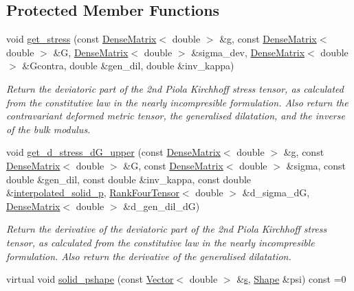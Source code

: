 \subsection*{Protected Member Functions}
\begin{DoxyCompactItemize}
\item 
void \hyperlink{classoomph_1_1PVDEquationsWithPressure_a4ae331361c8fd63725a55050e90e9e2d}{get\+\_\+stress} (const \hyperlink{classoomph_1_1DenseMatrix}{Dense\+Matrix}$<$ double $>$ \&g, const \hyperlink{classoomph_1_1DenseMatrix}{Dense\+Matrix}$<$ double $>$ \&G, \hyperlink{classoomph_1_1DenseMatrix}{Dense\+Matrix}$<$ double $>$ \&sigma\+\_\+dev, \hyperlink{classoomph_1_1DenseMatrix}{Dense\+Matrix}$<$ double $>$ \&Gcontra, double \&gen\+\_\+dil, double \&inv\+\_\+kappa)
\begin{DoxyCompactList}\small\item\em Return the deviatoric part of the 2nd Piola Kirchhoff stress tensor, as calculated from the constitutive law in the nearly incompresible formulation. Also return the contravariant deformed metric tensor, the generalised dilatation, and the inverse of the bulk modulus. \end{DoxyCompactList}\item 
void \hyperlink{classoomph_1_1PVDEquationsWithPressure_a35b1c9e4ebd765bbb185421c2c02aa1a}{get\+\_\+d\+\_\+stress\+\_\+d\+G\+\_\+upper} (const \hyperlink{classoomph_1_1DenseMatrix}{Dense\+Matrix}$<$ double $>$ \&g, const \hyperlink{classoomph_1_1DenseMatrix}{Dense\+Matrix}$<$ double $>$ \&G, const \hyperlink{classoomph_1_1DenseMatrix}{Dense\+Matrix}$<$ double $>$ \&sigma, const double \&gen\+\_\+dil, const double \&inv\+\_\+kappa, const double \&\hyperlink{classoomph_1_1PVDEquationsWithPressure_a9d8ecc731f98d8d4aae18b55f835bc61}{interpolated\+\_\+solid\+\_\+p}, \hyperlink{classoomph_1_1RankFourTensor}{Rank\+Four\+Tensor}$<$ double $>$ \&d\+\_\+sigma\+\_\+dG, \hyperlink{classoomph_1_1DenseMatrix}{Dense\+Matrix}$<$ double $>$ \&d\+\_\+gen\+\_\+dil\+\_\+dG)
\begin{DoxyCompactList}\small\item\em Return the derivative of the deviatoric part of the 2nd Piola Kirchhoff stress tensor, as calculated from the constitutive law in the nearly incompresible formulation. Also return the derivative of the generalised dilatation. \end{DoxyCompactList}\item 
virtual void \hyperlink{classoomph_1_1PVDEquationsWithPressure_ad580f7919412f6b574b76f514f56282c}{solid\+\_\+pshape} (const \hyperlink{classoomph_1_1Vector}{Vector}$<$ double $>$ \&\hyperlink{cfortran_8h_ab7123126e4885ef647dd9c6e3807a21c}{s}, \hyperlink{classoomph_1_1Shape}{Shape} \&psi) const =0

\end{DoxyCompactItemize}
